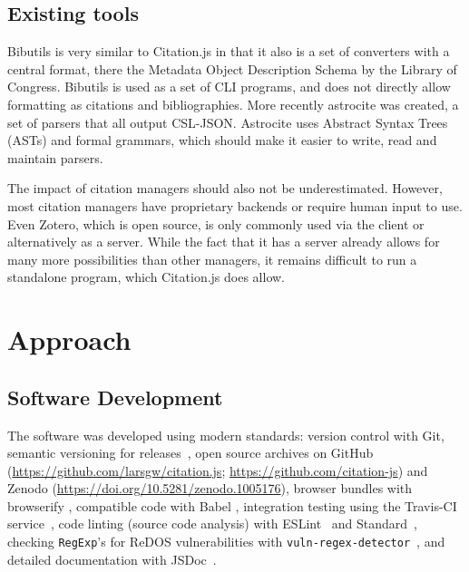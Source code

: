 \documentclass[fleqn,10pt,lineno]{wlpeerj} %
\begin{document}
\subsection*{Existing tools}

Bibutils is very similar to Citation.js in that it also is a set of converters with a central format, there the Metadata Object Description Schema by the Library of Congress. Bibutils is used as a set of CLI programs, and does not directly allow formatting as citations and bibliographies. More recently astrocite was created, a set of parsers that all output CSL-JSON. Astrocite uses Abstract Syntax Trees (ASTs) and formal grammars, which should make it easier to write, read and maintain parsers.

The impact of citation managers should also not be underestimated. However, most citation managers have proprietary backends or require human input to use. Even Zotero, which is open source, is only commonly used via the client or alternatively as a server. While the fact that it has a server already allows for many more possibilities than other managers, it remains difficult to run a standalone program, which Citation.js does allow.

\section*{Approach}

\subsection*{Software Development}

The software was developed using modern standards: version control with Git, semantic versioning for releases~\citep{preston-werner_semantic_2013}, open source archives on GitHub (\url{https://github.com/larsgw/citation.js}; \url{https://github.com/citation-js}) and Zenodo (\url{https://doi.org/10.5281/zenodo.1005176}), browser bundles with browserify \citep{Halliday2018browserify/browserify}, compatible code with Babel \citep{Zhu2018babel/babel}, integration testing using the Travis-CI service~\citep{noauthor_travis_2018}, code linting (source code analysis) with ESLint~\citep{Zakas2018eslint/eslint} and Standard~\citep{Aboukhadijeh2018standard/standard}, checking \texttt{RegExp}'s for ReDOS vulnerabilities with \texttt{vuln-regex-detector}~\citep{davis_impact_2018}, and detailed documentation with JSDoc~\citep{Williams2018jsdoc3/jsdoc}.
\end{document}
